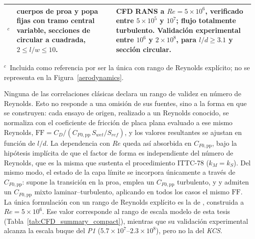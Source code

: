 \begin{table}[htpb]
\begin{tabularx}{\textwidth}{>{\raggedright\arraybackslash}p{2.3cm}
                             >{\raggedright\arraybackslash}X
                             >{\raggedright\arraybackslash}X}
\citet{gotten2021form}$^{c}$ &
70 cuerpos de proa y popa fijas con tramo central variable, secciones de
circular a cuadrada, $2 \leq l/w \leq 10$. &
CFD RANS a $Re = 5\times10^6$, verificado entre $5\times10^5$ y $10^7$;
flujo totalmente turbulento. Validación experimental entre $10^6$ y
$2\times10^8$, para $l/d \geq 3{.}1$ y sección circular. \\
\bottomrule
\end{tabularx}

\vspace{0.4em}
{\footnotesize\raggedright
$^{c}$~Incluida como referencia por ser la única con rango de Reynolds
explícito; no se representa en la Figura~\ref{aerodynamics}.\par}
\end{table}

Ninguna de las correlaciones clásicas declara un rango de validez en número
de Reynolds. Esto no responde a una omisión de sus fuentes, sino a la forma en
que se construyen: cada ensayo de origen, realizado a un Reynolds conocido, se
normaliza con el coeficiente de fricción de placa plana evaluado a ese mismo
Reynolds, $\mathrm{FF} = C_D/(C_{F0,\mathrm{pp}}\,S_{wet}/S_{ref})$, y los valores
resultantes se ajustan en función de $l/d$. La dependencia con $Re$ queda así
absorbida en $C_{F0,\mathrm{pp}}$, bajo la hipótesis implícita de que el factor de forma es
independiente del número de Reynolds, que es la misma que sustenta el
procedimiento ITTC-78 ($k_M = k_S$). Del mismo modo, el estado de la capa
límite se incorpora únicamente a través de $C_{F0,\mathrm{pp}}$:
\citet{torenbeek2010synthesis} supone la transición en la proa,
\citet{roskam1987airplane} emplea un $C_{F0,\mathrm{pp}}$ turbulento, y
\citet{raymer1992aircraft} y \citet{gur2010drag} admiten un $C_{F0,\mathrm{pp}}$ mixto
laminar--turbulento, aplicando en todos los casos el mismo $\mathrm{FF}$. La
única formulación con un rango de Reynolds explícito es la de
\citet{gotten2021form}, construida a $Re = 5\times10^6$. Ese valor corresponde
al rango de escala modelo de esta tesis
(Tabla~\ref{tab:CFD_summary_compact}), mientras que su validación
experimental alcanza la escala buque del \textit{P1}
($5{.}7\times10^{7}$--$2{.}3\times10^{8}$), pero no la del \textit{KCS}.

